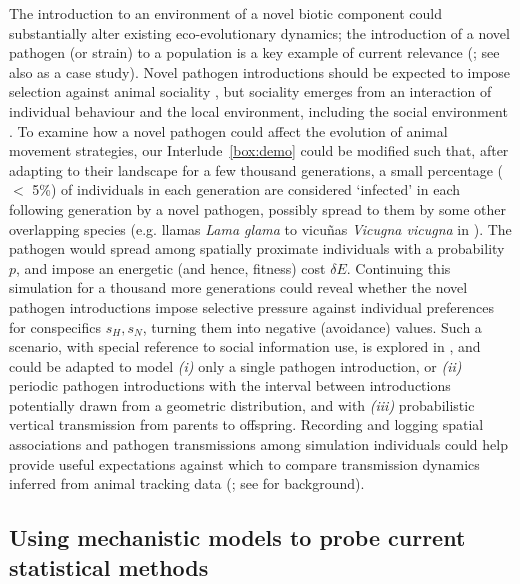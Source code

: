 The introduction to an environment of a novel biotic component could substantially alter existing eco-evolutionary dynamics; the introduction of a novel pathogen (or strain) to a population is a key example of current relevance (\cite{carlson2022a}; see also \cite{monk2022} as a case study).
Novel pathogen introductions should be expected to impose selection against animal sociality \parencite[e.g.][]{ashby2022}, but sociality emerges from an interaction of individual behaviour and the local environment, including the social environment \parencite{tanner2012}.
To examine how a novel pathogen could affect the evolution of animal movement strategies, our Interlude~\ref{box:demo} could be modified such that, after adapting to their landscape for a few thousand generations, a small percentage ($<$ 5\%) of individuals in each generation are considered `infected' in each following generation by a novel pathogen, possibly spread to them by some other overlapping species (e.g. llamas \emph{Lama glama} to vicu\~nas \emph{Vicugna vicugna} in \cite{monk2022}).
The pathogen would spread among spatially proximate individuals with a probability $p$, and impose an energetic (and hence, fitness) cost $\delta E$.
Continuing this simulation for a thousand more generations could reveal whether the novel pathogen introductions impose selective pressure against individual preferences for conspecifics $s_H, s_N$, turning them into negative (avoidance) values.
Such a scenario, with special reference to social information use, is explored in \textcite{gupte2022c}, and could be adapted to model \textit{(i)} only a single pathogen introduction, or \textit{(ii)} periodic pathogen introductions with the interval between introductions potentially drawn from a geometric distribution, and with \textit{(iii)} probabilistic vertical transmission from parents to offspring.
Recording and logging spatial associations and pathogen transmissions among simulation individuals could help provide useful expectations against which to compare transmission dynamics inferred from animal tracking data (\cite{wilber2022}; see \cite{robitaille2019,albery2021} for background).

\subsection*{Using mechanistic models to probe current statistical methods}

